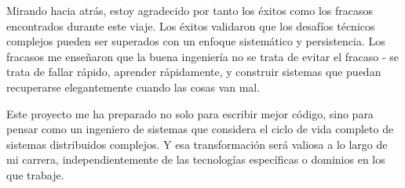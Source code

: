 Mirando hacia atrás, estoy agradecido por tanto los éxitos como los fracasos encontrados durante este viaje. Los éxitos validaron que los desafíos técnicos complejos pueden ser superados con un enfoque sistemático y persistencia. Los fracasos me enseñaron que la buena ingeniería no se trata de evitar el fracaso - se trata de fallar rápido, aprender rápidamente, y construir sistemas que puedan recuperarse elegantemente cuando las cosas van mal.

Este proyecto me ha preparado no solo para escribir mejor código, sino para pensar como un ingeniero de sistemas que considera el ciclo de vida completo de sistemas distribuidos complejos. Y esa transformación será valiosa a lo largo de mi carrera, independientemente de las tecnologías específicas o dominios en los que trabaje.